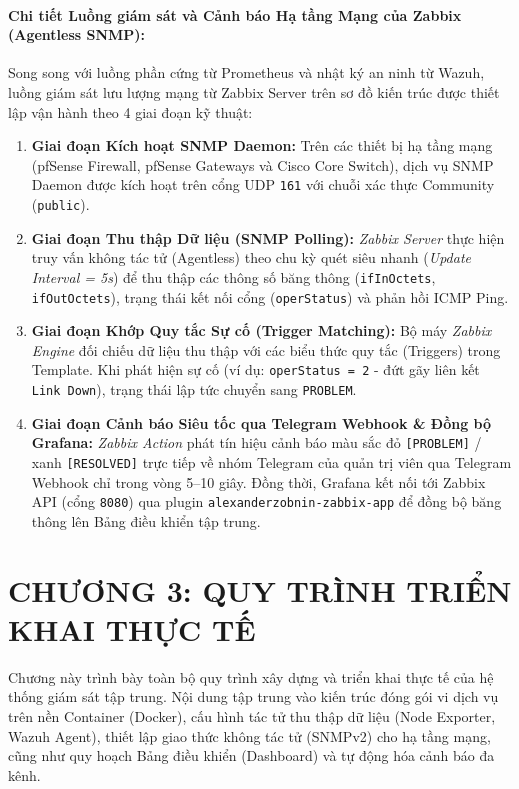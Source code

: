 \documentclass[13pt,a4paper]{extarticle}
\begin{document}
\paragraph{Chi tiết Luồng giám sát và Cảnh báo Hạ tầng Mạng của Zabbix (Agentless SNMP):}
Song song với luồng phần cứng từ Prometheus và nhật ký an ninh từ Wazuh, luồng giám sát lưu lượng mạng từ Zabbix Server trên sơ đồ kiến trúc được thiết lập vận hành theo 4 giai đoạn kỹ thuật:
\begin{enumerate}
    \item \textbf{Giai đoạn Kích hoạt SNMP Daemon:} Trên các thiết bị hạ tầng mạng (pfSense Firewall, pfSense Gateways và Cisco Core Switch), dịch vụ SNMP Daemon được kích hoạt trên cổng UDP \texttt{161} với chuỗi xác thực Community (\texttt{public}).
    \item \textbf{Giai đoạn Thu thập Dữ liệu (SNMP Polling):} \textit{Zabbix Server} thực hiện truy vấn không tác tử (Agentless) theo chu kỳ quét siêu nhanh (\textit{Update Interval = 5s}) để thu thập các thông số băng thông (\texttt{ifInOctets}, \texttt{ifOutOctets}), trạng thái kết nối cổng (\texttt{operStatus}) và phản hồi ICMP Ping.
    \item \textbf{Giai đoạn Khớp Quy tắc Sự cố (Trigger Matching):} Bộ máy \textit{Zabbix Engine} đối chiếu dữ liệu thu thập với các biểu thức quy tắc (Triggers) trong Template. Khi phát hiện sự cố (ví dụ: \texttt{operStatus = 2} - đứt gãy liên kết \texttt{Link Down}), trạng thái lập tức chuyển sang \texttt{PROBLEM}.
    \item \textbf{Giai đoạn Cảnh báo Siêu tốc qua Telegram Webhook \& Đồng bộ Grafana:} \textit{Zabbix Action} phát tín hiệu cảnh báo màu sắc đỏ \texttt{[PROBLEM]} / xanh \texttt{[RESOLVED]} trực tiếp về nhóm Telegram của quản trị viên qua Telegram Webhook chỉ trong vòng 5--10 giây. Đồng thời, Grafana kết nối tới Zabbix API (cổng \texttt{8080}) qua plugin \texttt{alexanderzobnin-zabbix-app} để đồng bộ băng thông lên Bảng điều khiển tập trung.
\end{enumerate}

\section{CHƯƠNG 3: QUY TRÌNH TRIỂN KHAI THỰC TẾ}

Chương này trình bày toàn bộ quy trình xây dựng và triển khai thực tế của hệ thống giám sát tập trung. Nội dung tập trung vào kiến trúc đóng gói vi dịch vụ trên nền Container (Docker), cấu hình tác tử thu thập dữ liệu (Node Exporter, Wazuh Agent), thiết lập giao thức không tác tử (SNMPv2) cho hạ tầng mạng, cũng như quy hoạch Bảng điều khiển (Dashboard) và tự động hóa cảnh báo đa kênh.
\end{document}
